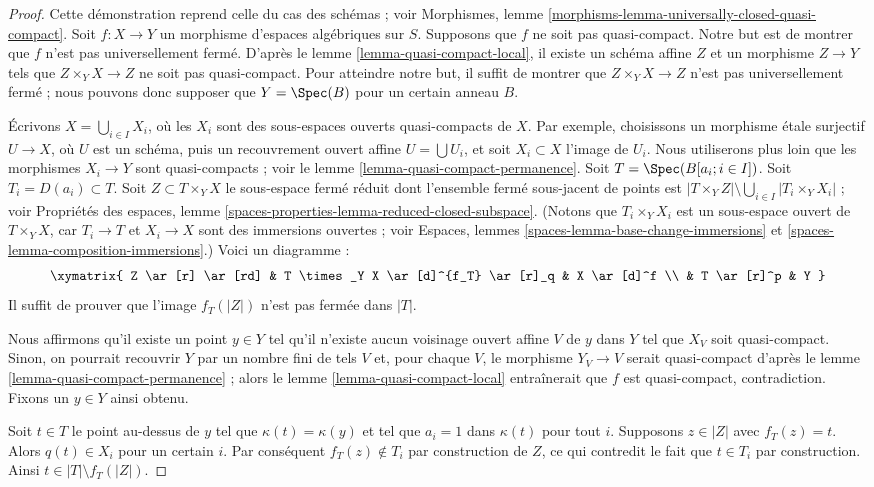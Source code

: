 \begin{proof}
Cette démonstration reprend celle du cas des schémas ; voir
Morphismes, lemme \ref{morphisms-lemma-universally-closed-quasi-compact}.
Soit $f : X \to Y$ un morphisme d'espaces algébriques sur $S$.
Supposons que $f$ ne soit pas quasi-compact.
Notre but est de montrer que $f$ n'est pas universellement fermé. D'après le
lemme \ref{lemma-quasi-compact-local},
il existe un schéma affine $Z$ et un morphisme $Z \to Y$
tels que $Z \times_Y X \to Z$ ne soit pas quasi-compact. Pour atteindre notre but,
il suffit de montrer que $Z \times_Y X \to Z$ n'est pas universellement fermé ;
nous pouvons donc supposer que $Y = \Spec(B)$ pour un certain anneau $B$.

\medskip\noindent
Écrivons $X = \bigcup_{i \in I} X_i$, où les $X_i$ sont des sous-espaces ouverts
quasi-compacts de $X$. Par exemple, choisissons un morphisme \'etale surjectif
$U \to X$, où $U$ est un schéma, puis un recouvrement ouvert affine
$U = \bigcup U_i$, et soit $X_i \subset X$ l'image de $U_i$.
Nous utiliserons plus loin que les morphismes $X_i \to Y$ sont quasi-compacts ; voir le
lemme \ref{lemma-quasi-compact-permanence}.
Soit $T = \Spec(B[a_i ; i \in I])$. Soit $T_i = D(a_i) \subset T$.
Soit $Z \subset T \times_Y X$ le sous-espace fermé réduit dont l'ensemble fermé
sous-jacent de points est
$|T \times_Y Z| \setminus \bigcup_{i \in I} |T_i \times_Y X_i|$ ; voir
Propriétés des espaces,
lemme \ref{spaces-properties-lemma-reduced-closed-subspace}.
(Notons que $T_i \times_Y X_i$ est un sous-espace ouvert de $T \times_Y X$, car
$T_i \to T$ et $X_i \to X$ sont des immersions ouvertes ; voir
Espaces, lemmes \ref{spaces-lemma-base-change-immersions} et
\ref{spaces-lemma-composition-immersions}.) Voici un diagramme :
$$
\xymatrix{
Z \ar[r] \ar[rd] &
T \times_Y X \ar[d]^{f_T} \ar[r]_q &
X \ar[d]^f \\
& T \ar[r]^p & Y
}
$$
Il suffit de prouver que l'image $f_T(|Z|)$ n'est pas fermée dans $|T|$.

\medskip\noindent
Nous affirmons qu'il existe un point $y \in Y$ tel qu'il n'existe aucun
voisinage ouvert affine $V$ de $y$ dans $Y$ tel que $X_V$ soit quasi-compact.
Sinon, on pourrait recouvrir $Y$ par un nombre fini de tels $V$ et, pour
chaque $V$, le morphisme $Y_V \to V$ serait quasi-compact d'après le
lemme \ref{lemma-quasi-compact-permanence} ;
alors le
lemme \ref{lemma-quasi-compact-local}
entraînerait que $f$ est quasi-compact, contradiction. Fixons un $y \in Y$ ainsi obtenu.

\medskip\noindent
Soit $t \in T$ le point au-dessus de $y$ tel que $\kappa(t) = \kappa(y)$
et tel que $a_i = 1$ dans $\kappa(t)$ pour tout $i$. Supposons $z \in |Z|$ avec
$f_T(z) = t$. Alors $q(t) \in X_i$ pour un certain $i$. Par conséquent $f_T(z) \not \in T_i$
par construction de $Z$, ce qui contredit le fait que $t \in T_i$ par
construction. Ainsi $t \in |T| \setminus f_T(|Z|)$.


\end{proof}
